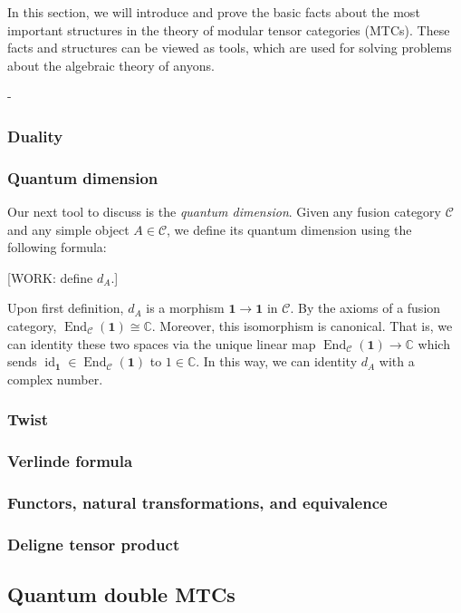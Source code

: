 \documentclass{article}
\theoremstyle{definition}
\DeclareMathOperator{\id}{id}
\DeclareMathOperator{\End}{End}
\newcommand{\CC}{\mathbb{C}}
\newcommand{\C}{\mathscr{C}}
\newcommand{\0}{\left|0\right>}
\newcommand{\1}{\left|1\right>}
\newcommand{\one}{\mathbf{1}}
\numberwithin{figure}{section}
\begin{document}
In this section, we will introduce and prove the basic facts about the most important structures in the theory of modular tensor categories (MTCs). These facts and structures can be viewed as tools, which are used for solving problems about the algebraic theory of anyons. 

 -
\subsubsection{Duality}

\subsubsection{Quantum dimension}

Our next tool to discuss is the \textit{quantum dimension}. Given any fusion category $\C$ and any simple object $A\in \C$, we define its quantum dimension using the following formula:

[WORK: define $d_A$.]

Upon first definition, $d_A$ is a morphism $\one\to \one$ in $\C$. By the axioms of a fusion category, $\End_\C(\one)\cong \CC$. Moreover, this isomorphism is canonical. That is, we can identity these two spaces via the unique linear map
$\End_\C(\one)\to \CC$ which sends $\id_{\one}\in \End_{\C}(\one)$ to $1\in \CC$. In this way, we can identity $d_A$ with a complex number.

\subsubsection{Twist}

\subsubsection{Verlinde formula}

\subsubsection{Functors, natural transformations, and equivalence}

\subsubsection{Deligne tensor product}



\subsection{Quantum double MTCs}
\end{document}
